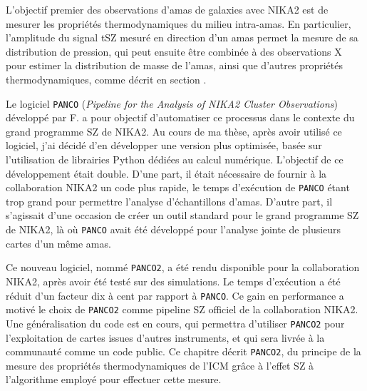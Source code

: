 L'objectif premier des observations d'amas de galaxies avec NIKA2 est de mesurer les propriétés thermodynamiques du milieu intra-amas.
En particulier, l'amplitude du signal tSZ mesuré en direction d'un amas permet la mesure de sa distribution de pression, qui peut ensuite être combinée à des observations X pour estimer la distribution de masse de l'amas, ainsi que d'autres propriétés thermodynamiques, comme décrit en section .

Le logiciel \texttt{PANCO} (\textit{Pipeline for the Analysis of NIKA2 Cluster Observations}) développé par F.  a pour objectif d'automatiser ce processus dans le contexte du grand programme SZ de NIKA2.
Au cours de ma thèse, après avoir utilisé ce logiciel, j'ai décidé d'en développer une version plus optimisée, basée sur l'utilisation de librairies Python dédiées au calcul numérique.
L'objectif de ce développement était double.
D'une part, il était nécessaire de fournir à la collaboration NIKA2 un code plus rapide, le temps d'exécution de \texttt{PANCO} étant trop grand pour permettre l'analyse d'échantillons d'amas.
D'autre part, il s'agissait d'une occasion de créer un outil standard pour le grand programme SZ de NIKA2, là où \texttt{PANCO} avait été développé pour l'analyse jointe de plusieurs cartes d'un même amas.

Ce nouveau logiciel, nommé \texttt{PANCO2}, a été rendu disponible pour la collaboration NIKA2, après avoir été testé sur des simulations.
Le temps d'exécution a été réduit d'un facteur dix à cent par rapport à \texttt{PANCO}.
Ce gain en performance a motivé le choix de \texttt{PANCO2} comme pipeline SZ officiel de la collaboration NIKA2.
Une généralisation du code est en cours, qui permettra d'utiliser \texttt{PANCO2} pour l'exploitation de cartes issues d'autres instruments, et qui sera livrée à la communauté comme un code public.
Ce chapitre décrit \texttt{PANCO2}, du principe de la mesure des propriétés thermodynamiques de l'ICM grâce à l'effet SZ à l'algorithme employé pour effectuer cette mesure.

